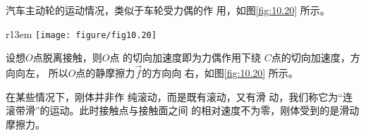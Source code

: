 \documentclass[../outline-of-mechanics.tex]{subfiles}
\begin{document}
\clearpage
\example 汽车主动轮的运动情况，类似于车轮受力偶的作
用，如图\ref{fig:10.20} 所示。

\begin{wrapfigure}[7]{r}{13em}
  \vspace{-1.56em}
  \centering
  \texttt{[image: figure/fig10.20]}
  \caption{}
  \label{fig:10.20}
\end{wrapfigure}
设想$ O $点脱离接触，则$ O $点
的切向加速度即为力偶作用下绕
$ C $点的切向加速度，方向向左，
所以$ O $点的静摩擦力$\vec{f}$的方向向
右，如图\ref{fig:10.20} 所示。

在某些情况下，刚体并非作
纯滚动，而是既有滚动，又有滑
动，我们称它为“连滚带滑”的运动。此时接触点与接触面之间
的相对速度不为零，刚体受到的是滑动摩擦力。
\end{document}
